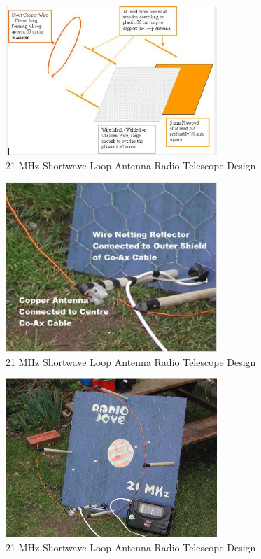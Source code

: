 \documentclass[runningheads,a4paper]{llncs}
\begin{document}
\begin{subappendices}
%
\begin{figure}[here]
\centering
\includegraphics[width=8cm]{images/14}
\caption{21 MHz Shortwave Loop Antenna Radio Telescope Design \citep{greef-12}}
\label{fig:loop_antenna_design_a}
\end{figure}
%

%
\begin{figure}[here]
\centering
\includegraphics[width=8cm]{images/16}
\caption{21 MHz Shortwave Loop Antenna Radio Telescope Design \citep{greef-12}}
\label{fig:loop_antenna_design_b}
\end{figure}
%

%
\begin{figure}[here]
\centering
\includegraphics[width=8cm]{images/15}
\caption{21 MHz Shortwave Loop Antenna Radio Telescope Design \citep{greef-12}}
\label{fig:loop_antenna_design_c}
\end{figure}
%

%
\end{subappendices}
\end{document}
